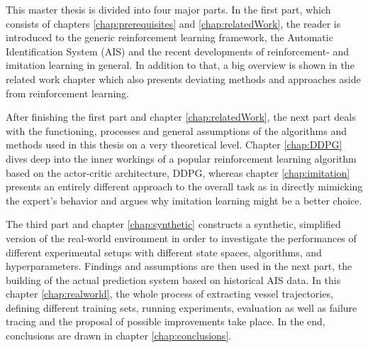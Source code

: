 This master thesis is divided into four major parts. In the first part, which consists of chapters \ref{chap:prerequisites} and \ref{chap:relatedWork}, the reader is introduced to the generic reinforcement learning framework, the Automatic Identification System (AIS) and the recent developments of reinforcement- and imitation learning in general. In addition to that, a big overview is shown in the related work chapter which also presents deviating methods and approaches aside from reinforcement learning.
\par
After finishing the first part and chapter \ref{chap:relatedWork}, the next part deals with the functioning, processes and general assumptions of the algorithms and methods used in this thesis on a very theoretical level. Chapter \ref{chap:DDPG} dives deep into the inner workings of a popular reinforcement learning algorithm based on the actor-critic architecture, DDPG, whereas chapter \ref{chap:imitation} presents an entirely different approach to the overall task as in directly mimicking the expert's behavior and argues why imitation learning might be a better choice.
\par
The third part and chapter \ref{chap:synthetic} constructs a synthetic, simplified version of the real-world environment in order to investigate the performances of different experimental setups with different state spaces, algorithms, and hyperparameters. Findings and assumptions are then used in the next part, the building of the actual prediction system based on historical AIS data. In this chapter \ref{chap:realworld}, the whole process of extracting vessel trajectories, defining different training sets, running experiments, evaluation as well as failure tracing and the proposal of possible improvements take place. In the end, conclusions are drawn in chapter \ref{chap:conclusions}.